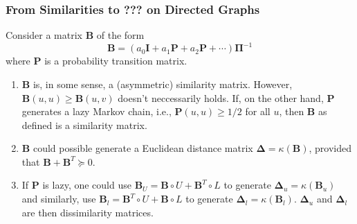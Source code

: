 \documentclass[professionalfonts,hyperref={pdfpagelabels=false,colorlinks=true,linkcolor=blue}]{beamer}
\begin{document}
\begin{frame}
  \frametitle{From Similarities to ??? on Directed Graphs}
  Consider a matrix $\mathbf{B}$ of the form
  \begin{equation*}
    \mathbf{B} =  (a_0
      \mathbf{I} + a_1 \mathbf{P} + a_2 \mathbf{P} + \cdots)\bm{\Pi}^{-1}
  \end{equation*}
  where $\mathbf{P}$ is a probability transition matrix.
  \begin{enumerate}
  \item $\mathbf{B}$ is, in some sense, a (asymmetric) similarity
    matrix. However, $\mathbf{B}(u,u) \geq \mathbf{B}(u,v)$ doesn't
    neccessarily holds. If, on the other hand, $\mathbf{P}$ generates
    a lazy Markov chain, i.e., $\mathbf{P}(u,u) \geq 1/2$ for all $u$,
    then $\mathbf{B}$ as defined is a similarity matrix.
  \item $\mathbf{B}$ could possible generate a Euclidean distance
    matrix $\bm{\Delta} = \kappa(\mathbf{B})$, provided that
    $\mathbf{B} + \mathbf{B}^{T} \succeq 0$. 
  \item If $\mathbf{P}$ is lazy, one could use $\mathbf{B}_U = \mathbf{B} \circ U +
    \mathbf{B}^{T} \circ L$ to generate $\bm{\Delta}_u = \kappa(\mathbf{B}_u)$ and similarly,
    use $\mathbf{B}_l = \mathbf{B}^{T} \circ U +
    \mathbf{B} \circ L$ to generate $\bm{\Delta}_l =
    \kappa(\mathbf{B}_l)$. $\bm{\Delta}_u$ and $\bm{\Delta}_l$ are
    then dissimilarity matrices.
  \end{enumerate}
\end{frame}


\end{document}
